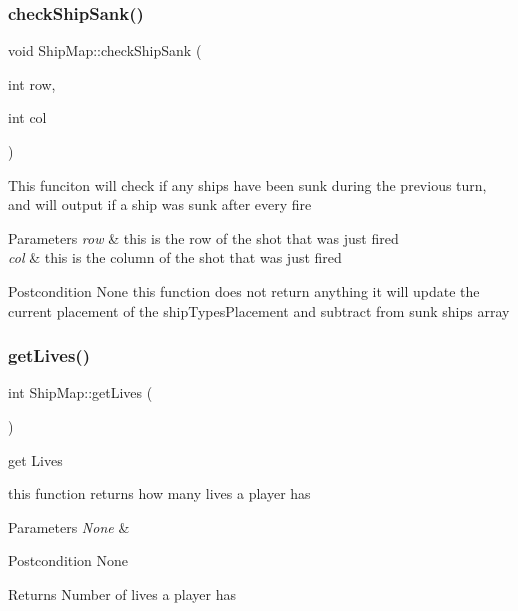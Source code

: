 \subsubsection{\texorpdfstring{check\+Ship\+Sank()}{checkShipSank()}}
{\footnotesize\ttfamily void Ship\+Map\+::check\+Ship\+Sank (\begin{DoxyParamCaption}\item[{int}]{row,  }\item[{int}]{col }\end{DoxyParamCaption})}

This funciton will check if any ships have been sunk during the previous turn, and will output if a ship was sunk after every fire 
\begin{DoxyParams}{Parameters}
{\em row} & this is the row of the shot that was just fired \\
\hline
{\em col} & this is the column of the shot that was just fired \\
\hline
\end{DoxyParams}
\begin{DoxyPostcond}{Postcondition}
None this function does not return anything it will update the current placement of the ship\+Types\+Placement and subtract from sunk ships array 
\end{DoxyPostcond}
\mbox{\label{classShipMap_ac9ff6e1eb462884b8c0b9cd4bafaf471}} 
\subsubsection{\texorpdfstring{get\+Lives()}{getLives()}}
{\footnotesize\ttfamily int Ship\+Map\+::get\+Lives (\begin{DoxyParamCaption}{ }\end{DoxyParamCaption})}

get Lives

this function returns how many lives a player has 
\begin{DoxyParams}{Parameters}
{\em None} & \\
\hline
\end{DoxyParams}
\begin{DoxyPostcond}{Postcondition}
None 
\end{DoxyPostcond}
\begin{DoxyReturn}{Returns}
Number of lives a player has 
\end{DoxyReturn}
\mbox{\label{classShipMap_a3db9ea06b3d046991d891ae537da8cf9}} 
